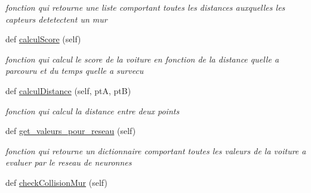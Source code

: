 \begin{DoxyCompactItemize}
\begin{DoxyCompactList}\small\item\em fonction qui retourne une liste comportant toutes les distances auxquelles les capteurs detetectent un mur \end{DoxyCompactList}\item 
def \hyperlink{classsrc_1_1_voiture_1_1voiture_1_1_voiture_a4d2b74b448d16d053ac5908fa8598885}{calcul\+Score} (self)
\begin{DoxyCompactList}\small\item\em fonction qui calcul le score de la voiture en fonction de la distance qu\textquotesingle{}elle a parcouru et du temps qu\textquotesingle{}elle a survecu \end{DoxyCompactList}\item 
def \hyperlink{classsrc_1_1_voiture_1_1voiture_1_1_voiture_a4dad4941537e1670a824a91e7bcde38d}{calcul\+Distance} (self, ptA, ptB)
\begin{DoxyCompactList}\small\item\em fonction qui calcul la distance entre deux points \end{DoxyCompactList}\item 
def \hyperlink{classsrc_1_1_voiture_1_1voiture_1_1_voiture_a1393a9fafd59f721506f550061de7a69}{get\+\_\+valeurs\+\_\+pour\+\_\+reseau} (self)
\begin{DoxyCompactList}\small\item\em fonction qui retourne un dictionnaire comportant toutes les valeurs de la voiture a evaluer par le reseau de neuronnes \end{DoxyCompactList}\item 
def \hyperlink{classsrc_1_1_voiture_1_1voiture_1_1_voiture_aedd6fbfe283ac4e8dbc80ae1ff5aeeb9}{check\+Collision\+Mur} (self)
\end{DoxyCompactItemize}
